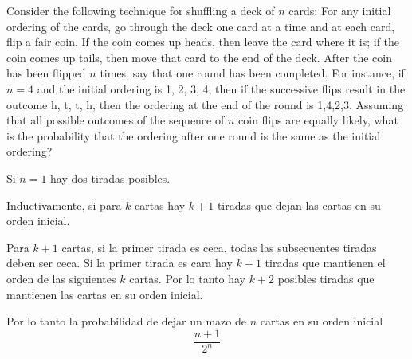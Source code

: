 \item Consider the following technique for shuffling a deck of $n$ cards: For any initial ordering of the cards, go through the deck one card at a time and at each card, flip a fair coin. If the coin comes up heads, then leave the card where it is; if the coin comes up tails, then move that card to the end of the deck. After the coin has been flipped $n$ times, say that one round has been completed. For instance, if $n = 4$ and the initial ordering is 1, 2, 3, 4, then if the successive flips result in the outcome h, t, t, h, then the ordering at the end of the round is 1,4,2,3. Assuming that all possible outcomes of the sequence of $n$ coin flips are equally likely, what is the probability that the ordering after one round is the same as the initial ordering?

Si $n = 1$ hay dos tiradas posibles.

Inductivamente, si para $k$ cartas hay $k+1$ tiradas que dejan las cartas en su orden inicial.

Para $k+1$ cartas, si la primer tirada es ceca, todas las subsecuentes tiradas deben ser ceca. Si la primer tirada es cara hay $k+1$ tiradas que mantienen el orden de las siguientes $k$ cartas. Por lo tanto hay $k+2$ posibles tiradas que mantienen las cartas en su orden inicial.

Por lo tanto la probabilidad de dejar un mazo de $n$ cartas en su orden inicial
\[ \frac{n+1}{2^n} \]